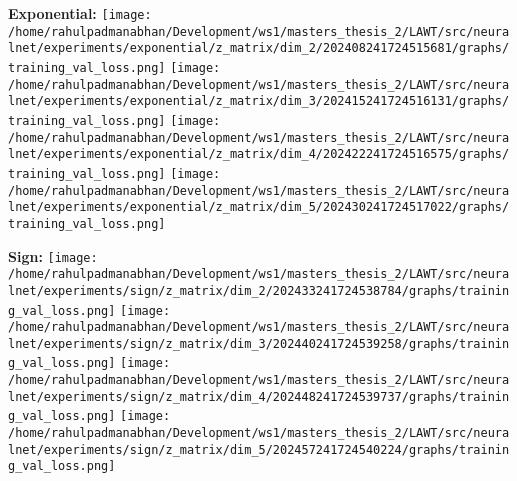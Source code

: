 \documentclass{article}
\begin{document}
\textbf{Exponential:}
\texttt{[image: /home/rahulpadmanabhan/Development/ws1/masters\_thesis\_2/LAWT/src/neuralnet/experiments/exponential/z\_matrix/dim\_2/202408241724515681/graphs/training\_val\_loss.png]}
\texttt{[image: /home/rahulpadmanabhan/Development/ws1/masters\_thesis\_2/LAWT/src/neuralnet/experiments/exponential/z\_matrix/dim\_3/202415241724516131/graphs/training\_val\_loss.png]}
\texttt{[image: /home/rahulpadmanabhan/Development/ws1/masters\_thesis\_2/LAWT/src/neuralnet/experiments/exponential/z\_matrix/dim\_4/202422241724516575/graphs/training\_val\_loss.png]}
\texttt{[image: /home/rahulpadmanabhan/Development/ws1/masters\_thesis\_2/LAWT/src/neuralnet/experiments/exponential/z\_matrix/dim\_5/202430241724517022/graphs/training\_val\_loss.png]}

\textbf{Sign:}
\texttt{[image: /home/rahulpadmanabhan/Development/ws1/masters\_thesis\_2/LAWT/src/neuralnet/experiments/sign/z\_matrix/dim\_2/202433241724538784/graphs/training\_val\_loss.png]}
\texttt{[image: /home/rahulpadmanabhan/Development/ws1/masters\_thesis\_2/LAWT/src/neuralnet/experiments/sign/z\_matrix/dim\_3/202440241724539258/graphs/training\_val\_loss.png]}
\texttt{[image: /home/rahulpadmanabhan/Development/ws1/masters\_thesis\_2/LAWT/src/neuralnet/experiments/sign/z\_matrix/dim\_4/202448241724539737/graphs/training\_val\_loss.png]}
\texttt{[image: /home/rahulpadmanabhan/Development/ws1/masters\_thesis\_2/LAWT/src/neuralnet/experiments/sign/z\_matrix/dim\_5/202457241724540224/graphs/training\_val\_loss.png]}
\end{document}
